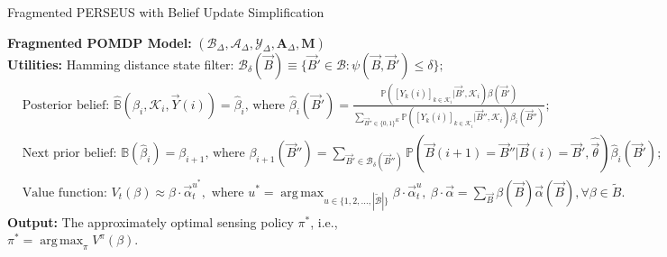 \documentclass[12pt, draftcls, onecolumn]{IEEEtran}
\DeclareMathOperator*{\argmax}{arg\,max}
\begin{document}
\begin{algorithm}[t]
    \caption{Fragmented PERSEUS with Belief Update Simplification} 
    \label{Alg. PERSEUS}
    \begin{flushleft}
        \textbf{Fragmented POMDP Model: } $(\mathcal{B}_{\Delta},\mathcal{A}_{\Delta},\mathcal{Y}_{\Delta},\mathbf{A}_{\Delta},\mathbf{M})$ \\
        \textbf{Utilities: }Hamming distance state filter: $\mathcal{B}_{\delta}(\vec{B}){\equiv}\{\vec{B}'{\in}\mathcal{B}:\psi(\vec{B},\vec{B}'){\leq}\delta\};$
        \begin{align*}
            &\text{Posterior belief: }\hat{\mathbb{B}}(\beta_{i},\mathcal{K}_{i},\vec{Y}(i)){=}\hat{\beta}_{i}\text{, where }\hat{\beta}_{i}(\vec{B}'){=}\frac{\mathbb{P}([Y_{k}(i)]_{k{\in}\mathcal{K}_{i}}|\vec{B}',\mathcal{K}_{i})\beta(\vec{B}')}{\sum_{\vec{B}''{\in}\{0,1\}^{K}}\mathbb{P}([Y_{k}(i)]_{k{\in}\mathcal{K}_{i}}|\vec{B}'',\mathcal{K}_{i})\beta_{i}(\vec{B}'')};\\
            &\text{Next prior belief: }\mathbb{B}(\hat{\beta}_{i}){=}\beta_{i+1}\text{, where }\beta_{i+1}(\vec{B}''){=}\sum_{\vec{B}'{\in}\mathcal{B}_{\delta}(\vec{B}'')}\mathbb{P}(\vec{B}(i{+}1){=}\vec{B}''|\vec{B}(i){=}\vec{B}',\hat{\vec{\theta}})\hat{\beta}_i(\vec{B}');\\
            &\text{Value function: }V_{t}(\beta){\approx}\beta{\cdot}\vec{\alpha}_{t}^{u^*},\text{ where }u^*{=}\argmax_{u\in\{1,2,\dots,|\tilde{\mathcal{B}}|\}} \beta{\cdot}\vec{\alpha}_{t}^{u},\ \beta{\cdot}\vec{\alpha}{=}\sum_{\vec{B}}\beta(\vec{B})\vec{\alpha}(\vec{B}),{\forall}\beta{\in}\tilde{B}.
        \end{align*}
        \textbf{Output: } The approximately optimal sensing policy $\pi^{*}$, i.e., $\pi^{*}{=}\argmax_{\pi}V^{\pi}(\beta)$.
    \end{flushleft}
    \begin{algorithmic}[1]
         
         
             
             

\end{algorithmic}
\end{algorithm}
\end{document}
